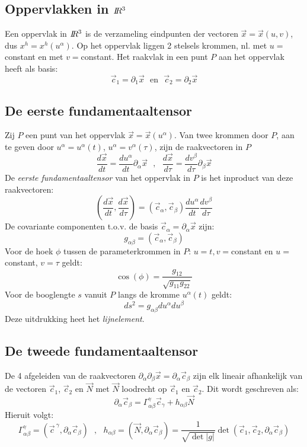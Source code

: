 \documentclass[twoside]{report}
\begin{document}
\subsection{Oppervlakken in $I\hspace{-1mm}R^3$}
Een oppervlak in $I\hspace{-1mm}R^3$ is de verzameling eindpunten der vectoren $\vec{x}=\vec{x}(u,v)$,
dus $x^h=x^h(u^\alpha)$. Op het oppervlak liggen 2 stelsels krommen, nl. met
$u=$constant en met $v=$constant.
\npar
Het raakvlak in een punt $P$ aan het oppervlak heeft als basis:
\[
\vec{c}_1=\partial_1\vec{x}~~~\mbox{en}~~~\vec{c}_2=\partial_2\vec{x}
\]

\subsection{De eerste fundamentaaltensor}
Zij $P$ een punt van het oppervlak $\vec{x}=\vec{x}(u^\alpha)$. Van twee krommen
door $P$, aan te geven door $u^\alpha=u^\alpha(t)$, $u^\alpha=v^\alpha(\tau)$,
zijn de raakvectoren in $P$
\[
\frac{d\vec{x}}{dt}=\frac{du^\alpha}{dt}\partial_\alpha\vec{x}~~~,~~~
\frac{d\vec{x}}{d\tau}=\frac{dv^\beta}{d\tau}\partial_\beta\vec{x}
\]
De {\it eerste fundamentaaltensor} van het oppervlak in $P$ is het inproduct
van deze raakvectoren:
\[
\left(\frac{d\vec{x}}{dt},\frac{d\vec{x}}{d\tau}\right)=
(\vec{c}_\alpha,\vec{c}_\beta)\frac{du^\alpha}{dt}\frac{dv^\beta}{d\tau}
\]
De covariante componenten t.o.v. de basis $\vec{c}_\alpha=\partial_\alpha\vec{x}$
zijn:
\[
g_{\alpha\beta}=(\vec{c}_\alpha,\vec{c}_\beta)
\]
Voor de hoek $\phi$ tussen de parameterkrommen in $P$: $u=t,v=$constant en
$u=$constant, $v=\tau$ geldt:
\[
\cos(\phi)=\frac{g_{12}}{\sqrt{g_{11}g_{22}}}
\]
Voor de booglengte $s$ vanuit $P$ langs de kromme $u^\alpha(t)$ geldt:
\[
ds^2=g_{\alpha\beta}du^\alpha du^\beta
\]
Deze uitdrukking heet het {\it lijnelement}.

\subsection{De tweede fundamentaaltensor}
De 4 afgeleiden van de raakvectoren $\partial_\alpha\partial_\beta\vec{x}=\partial_\alpha\vec{c}_\beta$
zijn elk lineair afhankelijk van de vectoren $\vec{c}_1$, $\vec{c}_2$ en $\vec{N}$
met $\vec{N}$ loodrecht op $\vec{c}_1$ en $\vec{c}_2$. Dit wordt geschreven als:
\[
\partial_\alpha\vec{c}_\beta=\Gamma^\gamma_{\alpha\beta}\vec{c}_\gamma+h_{\alpha\beta}\vec{N}
\]
Hieruit volgt:
\[
\Gamma^\gamma_{\alpha\beta}=(\vec{c}^{~\gamma},\partial_\alpha\vec{c}_\beta)~~~,~~~
h_{\alpha\beta}=(\vec{N},\partial_\alpha\vec{c}_\beta)=\frac{1}{\sqrt{\det|g|}}\det(\vec{c}_1,\vec{c}_2,\partial_\alpha\vec{c}_\beta)
\]
\end{document}
